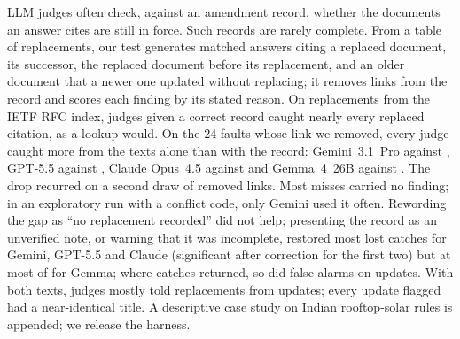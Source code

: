 LLM judges often check, against an amendment record, whether the documents an answer cites are still in force. Such records are rarely complete. From a table of replacements, our test generates matched answers citing a replaced document, its
successor, the replaced document before its replacement, and an older document that a newer one updated without
replacing; it removes links from the record and scores each finding by its stated reason. On \ENLinks{}
replacements from the IETF RFC index, judges given a correct record caught nearly every replaced citation, as a lookup would. On the 24 faults whose link we removed, every judge caught more from the texts alone
than with the record: Gemini~3.1~Pro \EGeminiGapTexts{} against \EGeminiGapDamaged, GPT-5.5
\EGPTGapTexts{} against \EGPTGapDamaged, Claude Opus~4.5 \EOpusGapTexts{} against \EOpusGapDamaged{} and Gemma~4~26B
\EGemmaGapTexts{} against \EGemmaGapDamaged. The drop recurred on a second draw of removed links.
Most misses carried no finding; in an exploratory run with a conflict code, only Gemini used it often. Rewording the gap
as ``no replacement recorded'' did not help; presenting the record as an unverified note, or warning that it was incomplete, restored most lost catches
for Gemini, GPT-5.5 and Claude (significant after correction for the first two) but at most \EGemmaArmCaveatGained{} of \EGemmaHTwoaLost{} for
Gemma; where catches returned, so did false alarms on updates. With both texts, judges mostly told replacements from updates;
every update flagged had a near-identical title. A descriptive case study on Indian rooftop-solar rules is appended; we release the
harness.
